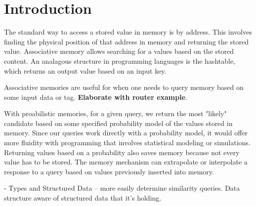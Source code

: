 \documentclass{sig-alternate}
\begin{document}
\section{Introduction}
\label{sec:intro}

The standard way to access a stored value in memory is by address. 
This involves finding the physical position of that address in memory
and returning the stored value. Associative memory allows
searching for a values based on the stored content. An analagous structure
in programming languages is the hashtable, which returns an output value
based on an input key. 

Associative memories are useful for when one needs to query memory based 
on some input data or tag. \textbf{Elaborate with router example}.

With proabilistic memories, for a given query, we return the most "likely" candidate 
based on some specified probability model of the values stored in memory. 
Since our queries work directly with a probability model, it would offer more fluidity
with programming that involves statistical modeling or simulations. Returning values
based on a probability also saves memory because not every value has to be stored. The 
memory mechanism can extrapolate or interpolate a response to a query based on values 
previously inserted into memory. 

- Types and Structured Data -- more easily determine similarity queries. Data structure aware of structured data that it's holding.

%
\end{document}
